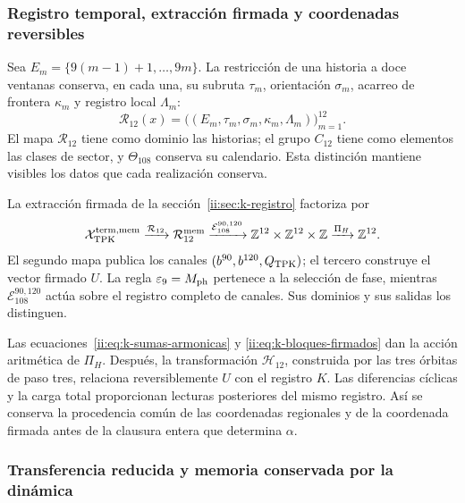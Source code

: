 \subsubsection{Registro temporal, extracción firmada y coordenadas reversibles}

Sea \(E_m=\{9(m-1)+1,\ldots,9m\}\). La restricción de una historia
a doce ventanas conserva, en cada una, su subruta \(\tau_m\),
orientación \(\sigma_m\), acarreo de frontera \(\kappa_m\) y registro
local \(\Lambda_m\):
\[
 \mathcal R_{12}(x)
 =\bigl((E_m,\tau_m,\sigma_m,\kappa_m,\Lambda_m)\bigr)_{m=1}^{12}.
\]
El mapa \(\mathcal R_{12}\) tiene como dominio las historias; el grupo
\(C_{12}\) tiene como elementos las clases de sector, y
\(\Theta_{108}\) conserva su calendario. Esta distinción mantiene
visibles los datos que cada realización conserva.

La extracción firmada de la sección~\ref{ii:sec:k-registro} factoriza por
\begin{equation}
 \mathcal X_{\rm TPK}^{\rm term,mem}
 \xrightarrow{\mathcal R_{12}}\mathcal R_{12}^{\rm mem}
 \xrightarrow{\mathcal E_{108}^{90,120}}
 \mathbb Z^{12}\times\mathbb Z^{12}\times\mathbb Z
 \xrightarrow{\Pi_H}\mathbb Z^{12}.
 \label{ii:ii:tpk-extraccion-tipada}
\end{equation}
El segundo mapa publica los canales
\((b^{90},b^{120},Q_{\rm TPK})\); el tercero construye el vector
firmado \(U\). La regla \(\varepsilon_9=M_{\rm ph}\) pertenece a la
selección de fase, mientras \(\mathcal E_{108}^{90,120}\) actúa sobre
el registro completo de canales. Sus dominios y sus salidas los distinguen.

Las ecuaciones~\eqref{ii:eq:k-sumas-armonicas} y
\eqref{ii:eq:k-bloques-firmados} dan la acción aritmética de \(\Pi_H\).
Después, la transformación \(\mathcal H_{12}\), construida por las
tres órbitas de paso tres, relaciona reversiblemente \(U\) con el
registro \(K\). Las diferencias cíclicas y la carga total proporcionan
lecturas posteriores del mismo registro. Así se conserva la procedencia
común de las coordenadas regionales y de la coordenada firmada antes de la
clausura entera que determina \(\alpha\).

\subsubsection{Transferencia reducida y memoria conservada por la dinámica}

